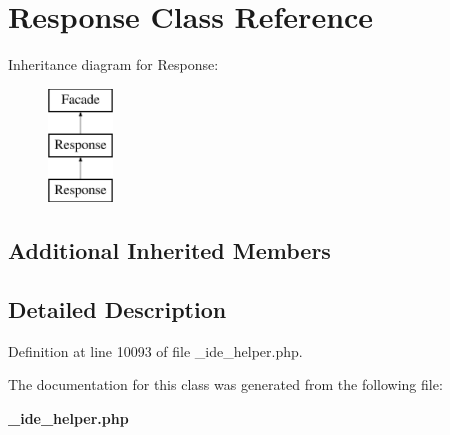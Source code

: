 \section{Response Class Reference}
\label{class_response}
Inheritance diagram for Response\+:\begin{figure}[H]
\begin{center}
\leavevmode
\includegraphics[height=3.000000cm]{class_response}
\end{center}
\end{figure}
\subsection*{Additional Inherited Members}


\subsection{Detailed Description}


Definition at line 10093 of file \+\_\+ide\+\_\+helper.\+php.



The documentation for this class was generated from the following file\+:\begin{DoxyCompactItemize}
\item 
{\bf \+\_\+ide\+\_\+helper.\+php}\end{DoxyCompactItemize}
